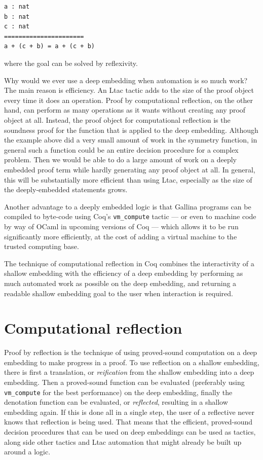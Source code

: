 \documentclass{puthesis}
\begin{document}
\begin{lstlisting}
a : nat
b : nat
c : nat
======================
a + (c + b) = a + (c + b) 
\end{lstlisting}

\noindent where the goal can be solved by reflexivity.

Why would we ever use a deep embedding when automation is so much
work? The main reason is efficiency. An Ltac tactic adds to the size
of the proof object every time it does an operation. Proof by
computational reflection, on the other hand, can perform as many
operations as it wants without creating any proof object at
all. Instead, the proof object for computational reflection is the
soundness proof for the function that is applied to the deep
embedding. Although the example above did a very small amount of work
in the symmetry function, in general such a function could be an
entire decision procedure for a complex problem. Then we would be able
to do a large amount of work on a deeply embedded proof term while
hardly generating any proof object at all. In general, this will be
substantially more efficient than using Ltac, especially as the size
of the deeply-embedded statements grows.

Another advantage to a deeply embedded logic is that Gallina programs
can be compiled to byte-code using Coq's \lstinline|vm_compute|
tactic --- or even to machine code by way of OCaml in upcoming versions
of Coq --- which allows it to be run significantly more efficiently, at
the cost of adding a virtual machine to the trusted computing base.

The technique of computational reflection in Coq combines the
interactivity of a shallow embedding with the efficiency of a deep
embedding by performing as much automated work as possible on the deep
embedding, and returning a readable shallow embedding goal to the user
when interaction is required.

\section{Computational reflection}
\label{sec:reflection}

Proof by reflection is the technique of using proved-sound computation
on a deep embedding to make progress in a proof. To use reflection on
a shallow embedding, there is first a translation, or
\emph{reification} from the shallow embedding into a deep
embedding. Then a proved-sound function can be evaluated (preferably
using \lstinline|vm_compute| for the best performance) on the deep
embedding, finally the denotation function can be evaluated, or
\emph{reflected}, resulting in a shallow embedding again.  If this is
done all in a single step, the user of a reflective never knows that
reflection is being used. That means that the efficient, proved-sound
decision procedures that can be used on deep embeddings can be used as
tactics, along side other tactics and Ltac automation that might
already be built up around a logic.
\end{document}
